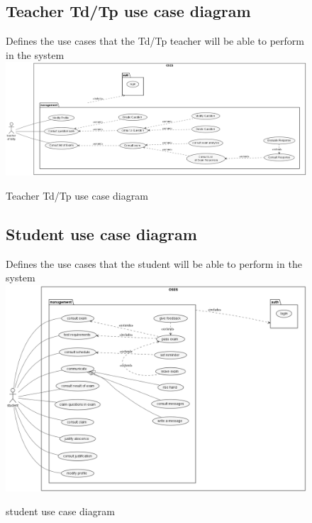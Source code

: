 \documentclass[]{uc2pfecaneva}
\begin{document}
    \begin{figure}
        \subsection{Teacher Td/Tp use case diagram}
        Defines the use cases that the Td/Tp teacher will be able to perform in the system
        \centering
        \includegraphics[width=\textwidth]{images/TP_TD_Teacher}
        \caption{Teacher Td/Tp use case diagram}
    \end{figure}

    \begin{figure}
        \subsection{Student use case diagram}
        Defines the use cases that the student will be able to perform in the system
        \centering
        \includegraphics[width=350pt]{images/student_UCD}
        \caption{student use case diagram}
    \end{figure}
\end{document}
